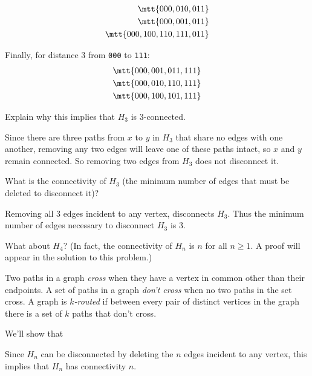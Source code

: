 \begin{problem}
\begin{solution}
\begin{align*}
\mtt{000, 010, 011}\\
\mtt{000, 001, 011}\\
\mtt{000, 100, 110, 111, 011}
\end{align*}

Finally, for distance 3 from \texttt{000} to \texttt{111}:
\begin{align*}
\mtt{000, 001, 011, 111}\\
\mtt{000, 010, 110, 111}\\
\mtt{000, 100, 101, 111}
\end{align*}\end{solution}

\ppart Explain why this implies that $H_3$ is $3$-connected.

\begin{solution}Since there are three paths from $x$ to $y$ in $H_3$ that share
  no edges with one another, removing any two edges will leave one of
  these paths intact, so $x$ and $y$ remain connected.  So removing two
  edges from $H_3$ does not disconnect it.\end{solution}

\ppart What is the connectivity of $H_3$ (the minimum number of edges that
must be deleted to disconnect it)?

\begin{solution}Removing all $3$ edges incident to any vertex, disconnects
  $H_3$.  Thus the minimum number of edges necessary to disconnect $H_3$
  is $3$.\end{solution}

\ppart What about $H_4$?  (In fact, the connectivity of $H_n$ is $n$ for
all $n \geq 1$.  A proof will appear in the solution to this problem.)

\begin{solution}
Two paths in a graph \emph{cross} when they have a vertex in common other
than their endpoints.  A set of paths in a graph \emph{don't cross} when no
two paths in the set cross.  A graph is \emph{$k$-routed} if between every
pair of distinct vertices in the graph there is a set of $k$ paths that
don't cross.

We'll show that

Since $H_n$ can be disconnected by deleting the $n$ edges incident to any
vertex, this implies that $H_n$ has connectivity $n$.


\end{solution}
\end{problem}
